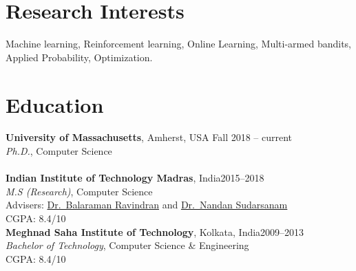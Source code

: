 \documentclass[margin,11pt]{res}
\begin{document}
\begin{resume}

\section{Research Interests}

Machine learning, Reinforcement learning, Online Learning, Multi-armed bandits, Applied Probability, Optimization.

%


\section{Education}
\textbf{University of Massachusetts}, Amherst, USA \hfill Fall 2018 -- current\\
{\sl Ph.D.}, Computer Science \\
\\[0.25cm]
\textbf{Indian Institute of Technology Madras}, India\hfill 2015--2018 \\
{\sl M.S (Research)}, Computer Science \\
Advisers: \href{https://www.cse.iitm.ac.in/~ravi/}{Dr.~Balaraman Ravindran} and \href{https://doms.iitm.ac.in/index.php/nandan-s}{Dr.~Nandan Sudarsanam}\\ CGPA: 8.4/10
\\[0.25cm]
\textbf{Meghnad Saha Institute of Technology}, Kolkata, India\hfill 2009--2013\\
{\sl Bachelor of Technology}, Computer Science \& Engineering\\ CGPA: 8.4/10

\end{resume}
\end{document}
